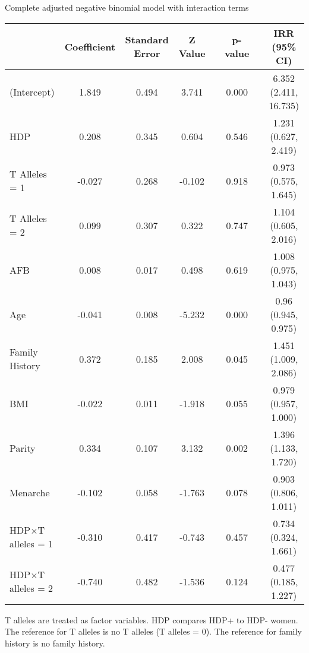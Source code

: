 \documentclass{standalone}
\begin{document}
\begin{threeparttable}
\caption{Complete adjusted negative binomial model with interaction terms} 
\begin{tabular}{@{}lccccccc@{}}
  \toprule
 & Coefficient & Standard Error & Z Value & \hspace{1em} & p-value & \hspace{1em} & IRR (95\% CI) \\ 
  \midrule
(Intercept) & 1.849 & 0.494 & 3.741 && 0.000 && 6.352 (2.411, 16.735) \\ 
  HDP & 0.208 & 0.345 & 0.604 && 0.546 && 1.231 (0.627, 2.419) \\ 
  T Alleles = 1 & -0.027 & 0.268 & -0.102 && 0.918 && 0.973 (0.575, 1.645) \\ 
  T Alleles = 2 & 0.099 & 0.307 & 0.322 && 0.747 && 1.104 (0.605, 2.016) \\ 
  AFB & 0.008 & 0.017 & 0.498 && 0.619 && 1.008 (0.975, 1.043) \\ 
  Age & -0.041 & 0.008 & -5.232 && 0.000 && 0.96 (0.945, 0.975) \\ 
  Family History & 0.372 & 0.185 & 2.008 && 0.045 && 1.451 (1.009, 2.086) \\ 
  BMI & -0.022 & 0.011 & -1.918 && 0.055 && 0.979 (0.957, 1.000) \\ 
  Parity & 0.334 & 0.107 & 3.132 && 0.002 && 1.396 (1.133, 1.720) \\ 
  Menarche & -0.102 & 0.058 & -1.763 && 0.078 && 0.903 (0.806, 1.011) \\ 
  HDP$\times$T alleles = 1 & -0.310 & 0.417 & -0.743 && 0.457 && 0.734 (0.324, 1.661) \\ 
  HDP$\times$T alleles = 2 & -0.740 & 0.482 & -1.536 && 0.124 && 0.477 (0.185, 1.227) \\ 
   \bottomrule
\end{tabular}
\begin{tablenotes}
\small
\item T alleles are treated as factor variables. HDP compares HDP+ to HDP- women. The reference for T alleles is no T alleles (T alleles = 0). The reference for family history is no family history.
\end{tablenotes}
\end{threeparttable}
\end{document}
